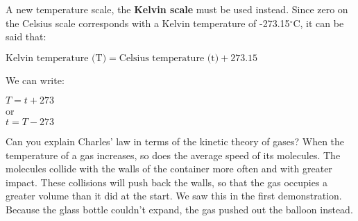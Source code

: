 A new temperature scale, the \textbf{Kelvin scale} must be used instead. Since zero on the Celsius scale corresponds with a Kelvin temperature of -273.15$^{\circ}$C, it can be said that:

\begin{center}
$\text{Kelvin temperature (T)} = \text{Celsius temperature (t)} + 273.15$
\end{center}

We can write:

\begin{center}
$T = t + 273$\\

or\\

$t = T - 273$
\end{center}

Can you explain Charles' law in terms of the kinetic theory of gases? When the temperature of a gas increases, so does the average speed of its molecules. The molecules collide with the walls of the container more often and with greater impact. These collisions will push back the walls, so that the gas occupies a greater volume than it did at the start. We saw this in the first demonstration. Because the glass bottle couldn't expand, the gas pushed out the balloon instead.

